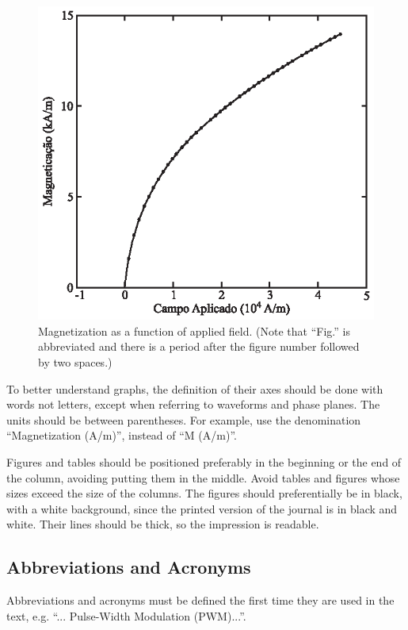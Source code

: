\documentclass[english]{sobraep}
\begin{document}
\begin{figure}[H]
	\includegraphics[scale=1]{figura.eps}
	\centering
	\caption{Magnetization as a function of applied field. (Note that ``Fig.'' is abbreviated and there is a period after the figure number followed by two spaces.)}
	\label{fig:fig1}
\end{figure}

To better understand graphs, the definition of their axes should be done with words not letters, except when referring to waveforms and phase planes. The units should be between parentheses. For example, use the denomination ``Magnetization (A/m)'', instead of ``M (A/m)''.

Figures and tables should be positioned preferably in the beginning or the end of the column, avoiding putting them in the middle. Avoid tables and figures whose sizes exceed the size of the columns. The figures should preferentially be in black, with a white background, since the printed version of the journal is in black and white. Their lines should be thick, so the impression is readable.

\subsection{Abbreviations and Acronyms}
Abbreviations and acronyms must be defined the first time they are used in the text, e.g. ``... Pulse-Width Modulation (PWM)...''.
\end{document}
